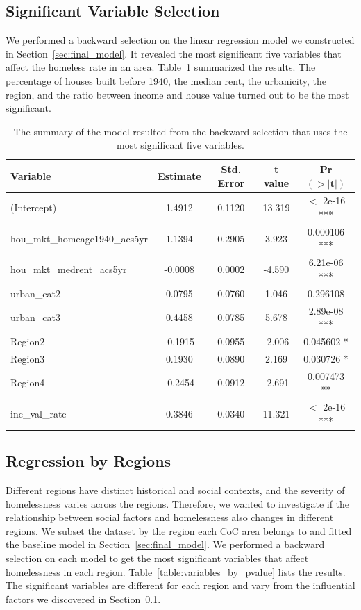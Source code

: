 \documentclass[12pt]{article}
\begin{document}
\subsection{Significant Variable Selection}\label{sec:significant}

We performed a backward selection on the linear regression model we constructed in Section~\ref{sec:final_model}. It revealed the most significant five variables that affect the homeless rate in an area. Table~\ref{table:regression-output} summarized the results. The percentage of houses built before 1940, the median rent, the urbanicity, the region, and the ratio between income and house value turned out to be the most significant. 

\begin{table}[ht]
\centering
\begin{tabular}{lcccc}
\hline
\textbf{Variable} & \textbf{Estimate} & \textbf{Std. Error} & \textbf{t value} & \textbf{Pr}$\mathbf{(>|t|)}$ \\
\hline
(Intercept) & 1.4912 & 0.1120 & 13.319 & $<$ 2e-16 *** \\
hou\_mkt\_homeage1940\_acs5yr & 1.1394 & 0.2905 & 3.923 & 0.000106 *** \\
hou\_mkt\_medrent\_acs5yr & -0.0008 & 0.0002 & -4.590 & 6.21e-06 *** \\
urban\_cat2 & 0.0795 & 0.0760 & 1.046 & 0.296108 \\
urban\_cat3 & 0.4458 & 0.0785 & 5.678 & 2.89e-08 *** \\
Region2 & -0.1915 & 0.0955 & -2.006 & 0.045602 * \\
Region3 & 0.1930 & 0.0890 & 2.169 & 0.030726 * \\
Region4 & -0.2454 & 0.0912 & -2.691 & 0.007473 ** \\
inc\_val\_rate & 0.3846 & 0.0340 & 11.321 & $<$ 2e-16 *** \\
\hline
\end{tabular}
\caption{The summary of the model resulted from the backward selection that uses the most significant five variables.}
\label{table:regression-output}
\end{table}

\subsection{Regression by Regions}

Different regions have distinct historical and social contexts, and the severity of homelessness varies across the regions. Therefore, we wanted to investigate if the relationship between social factors and homelessness also changes in different regions. We subset the dataset by the region each CoC area belongs to and fitted the baseline model in Section~\ref{sec:final_model}. We performed a backward selection on each model to get the most significant variables that affect homelessness in each region. Table~\ref{table:variables_by_pvalue} lists the results. The significant variables are different for each region and vary from the influential factors we discovered in Section~\ref{sec:significant}.
\end{document}
